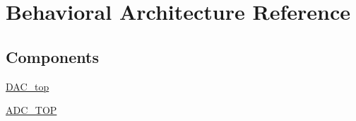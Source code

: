 \hypertarget{class_throughput__top_1_1_behavioral}{\section{Behavioral Architecture Reference}
\label{class_throughput__top_1_1_behavioral}
}
\subsection*{Components}
 \begin{DoxyCompactItemize}
\item 
\hypertarget{class_throughput__top_1_1_behavioral_af1728035de6352d63f154544ef1c3bba}{\hyperlink{class_throughput__top_1_1_behavioral_af1728035de6352d63f154544ef1c3bba}{D\-A\-C\-\_\-top}  {\bfseries }  }\label{class_throughput__top_1_1_behavioral_af1728035de6352d63f154544ef1c3bba}

\item 
\hypertarget{class_throughput__top_1_1_behavioral_a7a18f50a54f16177c6eca989b84ebc7b}{\hyperlink{class_throughput__top_1_1_behavioral_a7a18f50a54f16177c6eca989b84ebc7b}{A\-D\-C\-\_\-\-T\-O\-P}  {\bfseries }  }\label{class_throughput__top_1_1_behavioral_a7a18f50a54f16177c6eca989b84ebc7b}

\end{DoxyCompactItemize}
